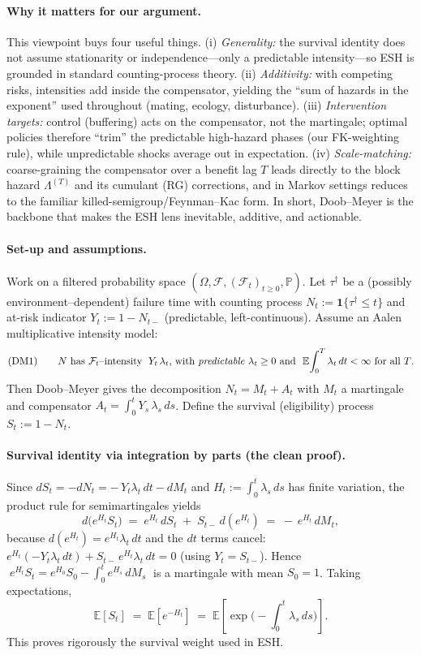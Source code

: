 \documentclass[11pt]{article}
\theoremstyle{upright}
\newcommand{\E}{\mathbb{E}}
\newcommand{\hazT}[1]{\Lambda^{(#1)}}          %
\begin{document}
\paragraph{Why it matters for our argument.}
This viewpoint buys four useful things. (i) \emph{Generality:} the survival identity does not assume stationarity or independence—only a predictable intensity—so ESH is grounded in standard counting-process theory. (ii) \emph{Additivity:} with competing risks, intensities add inside the compensator, yielding the “sum of hazards in the exponent” used throughout (mating, ecology, disturbance). (iii) \emph{Intervention targets:} control (buffering) acts on the compensator, not the martingale; optimal policies therefore “trim” the predictable high-hazard phases (our FK-weighting rule), while unpredictable shocks average out in expectation. (iv) \emph{Scale-matching:} coarse-graining the compensator over a benefit lag $T$ leads directly to the block hazard $\hazT{T}$ and its cumulant (RG) corrections, and in Markov settings reduces to the familiar killed-semigroup/Feynman–Kac form. In short, Doob--Meyer is the backbone that makes the ESH lens inevitable, additive, and actionable.

\paragraph{Set-up and assumptions.}
Work on a filtered probability space $(\Omega,\mathcal F,(\mathcal F_t)_{t\ge0},\mathbb P)$.
Let $\tau^\dagger$ be a (possibly environment–dependent) failure time with counting process
$N_t:=\mathbf 1\{\tau^\dagger\le t\}$ and at-risk indicator $Y_t:=1-N_{t-}$ (predictable, left-continuous).
Assume an Aalen multiplicative intensity model:
\[
\text{(DM1)}\qquad \text{$N$ has $\mathcal F_t$–intensity $\;Y_t\,\lambda_t$, with \emph{predictable} $\lambda_t\ge 0$ and } \ \E\!\int_0^T \lambda_t\,dt<\infty \text{ for all $T$.}
\]
Then Doob--Meyer gives the decomposition $N_t=M_t+A_t$ with $M_t$ a martingale and compensator
$A_t=\int_0^t Y_s\,\lambda_s\,ds$. Define the survival (eligibility) process $S_t:=1-N_t$.

\paragraph{Survival identity via integration by parts (the clean proof).}
Since $dS_t=-dN_t=-\,Y_t\lambda_t\,dt-dM_t$ and $H_t:=\int_0^t \lambda_s\,ds$ has finite variation,
the product rule for semimartingales yields
\[
d\big(e^{H_t}S_t\big) \;=\; e^{H_t}\,dS_t \;+\; S_{t-}\,d(e^{H_t}) \;=\; -\,e^{H_t}\,dM_t,
\]
because $d(e^{H_t})=e^{H_t}\lambda_t\,dt$ and the $dt$ terms cancel: $e^{H_t}(-Y_t\lambda_t\,dt)+S_{t-}\,e^{H_t}\lambda_t\,dt=0$
(using $Y_t=S_{t-}$). Hence $\;e^{H_t}S_t=e^{H_0}S_0-\int_0^t e^{H_s}\,dM_s\;$ is a martingale with mean $S_0=1$.
Taking expectations,
\[
\E[S_t]\;=\;\E\!\left[e^{-H_t}\right] \;=\;\E\!\left[\exp\!\Big(-\int_0^t \lambda_s\,ds\Big)\right].
\tag{DM}
\label{eq:DM-survival}
\]
This proves rigorously the survival weight used in ESH.
\end{document}
